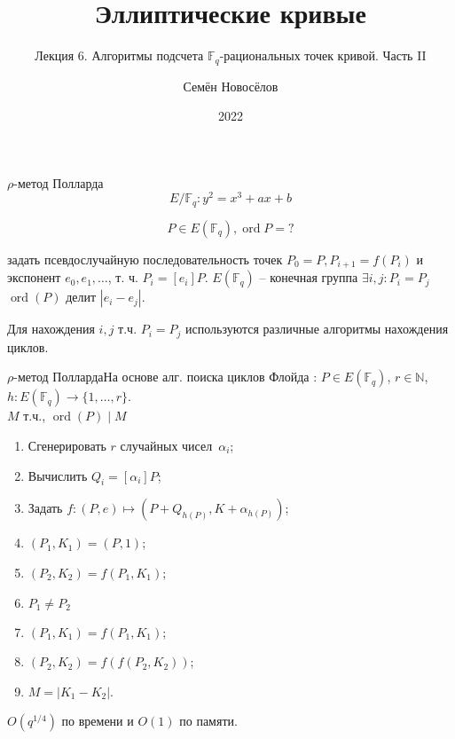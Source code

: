 \documentclass{beamer}
\title{Эллиптические кривые}
\subtitle{Лекция 6. Алгоритмы подсчета $\mathbb{F}_q$-рациональных точек кривой. Часть II}
\author{Семён Новосёлов}
\institute{БФУ им. И. Канта}
\date{2022}
\begin{document}
\frame{\titlepage}

\begin{frame}{$\rho$-метод Полларда}
\[E/\mathbb{F}_q: y^2 = x^3 + a x + b\]

\[P \in E(\mathbb{F}_q), \operatorname{ord}{P} = ?\]

 задать псевдослучайную последовательность точек $P_0 = P, P_{i+1} = f(P_{i})$ и экспонент $e_0, e_1, \ldots$, т. ч. $P_i = [e_i] P$. $E(\mathbb{F}_q)$ -- конечная группа \MyImplies $\exists i, j: P_i = P_j$ \MyImplies $\operatorname{ord}(P)$ делит $|e_i - e_j|$.

\vspace{1em}
Для нахождения $i,j$ т.ч. $P_i = P_j$ используются различные алгоритмы нахождения циклов.
\end{frame}

\begin{frame}{$\rho$-метод Полларда}{На основе алг. поиска циклов Флойда}
: $P \in E(\mathbb{F}_q)$, $r \in \mathbb{N}$, $h: E(\mathbb{F}_q) \rightarrow \{1, \ldots, r\}$. \\
 $M$ т.ч., $\operatorname{ord}(P) \mid M$\\
\begin{enumerate}
    \item Сгенерировать $r$ случайных чисел~$\alpha_i$;
    \item Вычислить $Q_i = [\alpha_i] P$;
    \item Задать $f: (P, e) \mapsto (P + Q_{h(P)}, K+\alpha_{h(P)})$;
    \item $(P_1, K_1) = (P, 1)$;
    \item $(P_2, K_2) = f(P_1, K_1)$;
    \item {} $P_1 \neq P_2$ 
    \item \quad $(P_1, K_1) = f(P_1, K_1)$;
    \item \quad $(P_2, K_2) = f(f(P_2, K_2))$;
    \item {} $M = |K_1 - K_2|$.
\end{enumerate}

 $O({q^{1/4}})$ по времени и $O(1)$ по памяти. 
\end{frame}

%    
\end{document}
